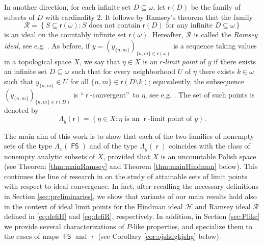 \documentclass{amsart}
\theoremstyle{plain}
\theoremstyle{definition}
\theoremstyle{remark}
\DeclareMathOperator{\FS}{\mathsf{FS}}
\DeclareMathOperator{\rr}{\mathsf{r}}
\begin{document}


In another direction, for each infinite set $D\subseteq \omega$, 
let $\mathsf{r}(D)$ be the family of subsets of $D$ with cardinality $2$. It follows by Ramsey's theorem that the family  
\begin{equation}\label{eq:defiR}
\mathcal{R}=\left\{S\subseteq \mathsf{r}(\omega): 
S\text{ does not contain }\mathsf{r}(D) 
\text{ for any infinite }D\subseteq \omega\right\}
\end{equation}
is an ideal on the countably infinite set $\mathsf{r}(\omega)$.  Hereafter, $\mathcal{R}$ is called the \emph{Ramsey ideal}, see e.g. \cite{MR3019575, alcantara-phd-thesis}. 
As before, if $y=(y_{\{n,m\}})_{\{n,m\} \in \mathsf{r}(\omega)}$ is a sequence taking values in a topological space $X$, we say that $\eta \in X$ is an $\mathsf{r}$\emph{-limit point} of $y$ if there exists an infinite set $D\subseteq \omega$ such that for every neighborhood $U$ of $\eta$ there exists $k \in \omega$ such that $y_{\{n,m\}} \in U$ for all $\{n,m\} \in \mathsf{r}(D\setminus k)$; equivalently, the subsequence $(y_{\{n,m\}})_{\{n,m\} \in \mathsf{r}(D)}$ is \textquotedblleft $\rr$-convergent\textquotedblright\, to $\eta$, see e.g. \cite{MR4741322, MR2948679}. The set of such points is denoted by 
\begin{equation*}
\Lambda_{y}(\mathsf{r})=
\left\{\eta \in X: \eta \text{ is an }\rr\text{-limit point of }y\right\}.
\end{equation*}


The main aim of this work is to show that 
each of the two families of nonempty sets of the type $\Lambda_{x}(\FS)$ and of the type $\Lambda_{y}(\rr)$ coincides with the class of nonempty analytic subsets of $X$, provided that $X$ is an uncountable Polish space (see Theorem \ref{thm:mainRamsey} and Theorem \ref{thm:mainHindman} below). 
This continues the line of research in \cite{MSP24, MR3883171, FKL24, MR4393937, MR4505549}
on the study of attainable sets of limit points with respect to ideal convergence. In fact, after recalling the necessary definitions in Section \ref{sec:preliminaries}, we show that variants of our main results hold also in the context of ideal limit points for the Hindman ideal $\mathcal{H}$ and Ramsey ideal $\mathcal{R}$ defined in \eqref{eq:defiH} and \eqref{eq:defiR}, respectively. In addition, in Section \ref{sec:Plike} we provide several characterizations of $P$-like properties, and specialize them to the cases of maps $\FS$ and $\rr$ (see Corollary \ref{cor:ojshdgkjshg} below). 
\end{document}
